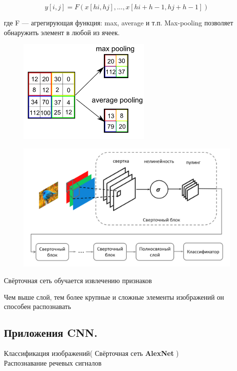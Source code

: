 \begin{description}
$$
y[i, j] = F \left( x[hi, hj], \ldots, x[hi + h - 1, hj + h - 1] \right)
$$

где  F  — агрегирующая функция: max, average и т.п. Max-pooling позволяет обнаружить элемент в любой из ячеек.

\begin{figure}[h]

\centering

\includegraphics[width=0.2\linewidth]{chapters/neural/images/пуллинг.png}

\label{fig:pulling}

\end{figure}

\begin{figure}[h]

\centering

\includegraphics[width=0.8\linewidth]{chapters/neural/images/1CNN.png}

\label{fig:one_cnn}

\end{figure}

Свёрточная сеть обучается извлечению признаков

Чем выше слой, тем более крупные и сложные элементы изображений он способен распознавать

\newpage
\subsection{Приложения CNN.}

Классификация изображений( Свёрточная сеть \textbf{AlexNet} )\\

Распознавание речевых сигналов\\
\begin{figure}[h]


\end{figure}
\end{description}
